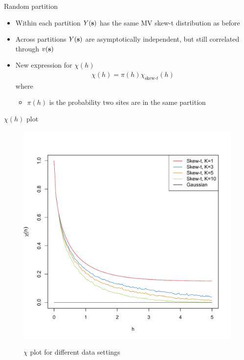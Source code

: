 \documentclass{beamer}
\begin{document}
\begin{frame}{Random partition}
  \begin{itemize} \setlength{\itemsep}{1em}
    \item Within each partition $Y(\mbox{\bf s})$ has the same MV skew-t distribution as before
    \item Across partitions $Y(\mbox{\bf s})$ are asymptotically independent, but still correlated through $v(\mbox{\bf s})$
    \item New expression for $\chi(h)$
    \begin{align*}
      \chi(h) = \pi(h) \chi_{\text{skew-}t}(h)
    \end{align*}
    where
    \begin{itemize}
      \item $\pi(h)$ is the probability two sites are in the same partition
    \end{itemize}
  \end{itemize}
\end{frame}

\begin{frame}{$\chi(h)$ plot}
  \vspace{-2em}
  \centering
  \begin{figure}
  \includegraphics[width=.65\linewidth]{./plots/pot/chi-h.pdf}\\[-0.2in]
  \caption{$\chi$ plot for different data settings}
  \end{figure}
\end{frame}
\end{document}
